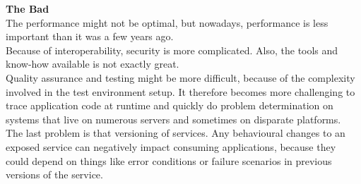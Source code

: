 \documentclass[12pt]{article}
\begin{document}
\newpage
\noindent\textbf{The Bad} \\
The performance might not be optimal, but nowadays, performance is less important than it was a few years ago. \\
Because of interoperability, security is more complicated. Also, the tools and know-how available is not exactly great.\\
Quality assurance and testing might be more difficult, because of the complexity involved in the test environment setup. It therefore becomes more challenging to trace application code at runtime and quickly do problem determination on systems that live on numerous servers and sometimes on disparate platforms.
\\
The last problem is that versioning of services. Any behavioural changes to an exposed service can negatively impact consuming applications, because they could  depend on things like error conditions or failure scenarios in previous versions of the service. \cite{pcsoa}
\end{document}
